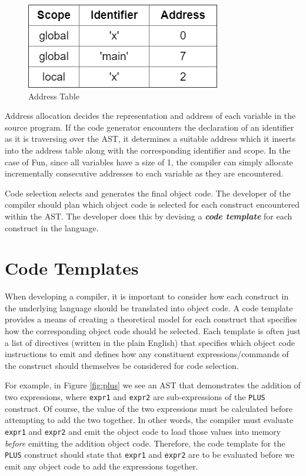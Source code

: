 \documentclass{l4proj}
\begin{document}
\begin{figure}[h]
\centering
\includegraphics[scale=0.5]{images/address-table.png}
\caption{Address Table}
\label{fig:address-table}	
\end{figure}

Address allocation decides the representation and address of each variable in the source program. If the code generator encounters the declaration of an identifier as it is traversing over the AST, it determines a suitable address which it inserts into the address table along with the corresponding identifier and scope. In the case of Fun, since all variables have a size of 1, the compiler can simply allocate incrementally consecutive addresses to each variable as they are encountered.

Code selection selects and generates the final object code. The developer of the compiler should plan which object code is selected for each construct encountered within the AST. The developer does this by devising a \textit{\textbf{code template}} for each construct in the language.

\section{Code Templates}
When developing a compiler, it is important to consider how each construct in the underlying language should be translated into object code. A code template provides a means of creating a theoretical model for each construct that specifies how the corresponding object code should be selected. Each template is often just a list of directives (written in the plain English) that specifies which object code instructions to emit and defines how any constituent expressions/commands of the construct should themselves be considered for code selection. 

For example, in Figure \ref{fig:plus} we see an AST that demonstrates the addition of two expressions, where \texttt{expr1} and \texttt{expr2} are sub-expressions of the \texttt{PLUS} construct. Of course, the value of the two expressions must be calculated before attempting to add the two together. In other words, the compiler must evaluate \texttt{expr1} and \texttt{expr2} and emit the object code to load those values into memory \textit{before} emitting the addition object code. Therefore, the code template for the \texttt{PLUS} construct should state that \texttt{expr1} and \texttt{expr2} are to be evaluated before we emit any object code to add the expressions together.
\end{document}
